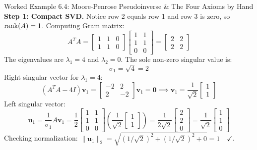 \begin{examplebox}[breakable]{Worked Example 6.4: Moore-Penrose Pseudoinverse \& The Four Axioms by Hand}
\textbf{Step 1: Compact SVD.}
Notice row 2 equals row 1 and row 3 is zero, so $\operatorname{rank}(A) = 1$.
Computing Gram matrix:
\begin{equation}
A^T A = \begin{bmatrix} 1 & 1 & 0 \\ 1 & 1 & 0 \end{bmatrix} \begin{bmatrix} 1 & 1 \\ 1 & 1 \\ 0 & 0 \end{bmatrix} = \begin{bmatrix} 2 & 2 \\ 2 & 2 \end{bmatrix}
\end{equation}
The eigenvalues are $\lambda_1 = 4$ and $\lambda_2 = 0$.
The sole non-zero singular value is:
\begin{equation}
\sigma_1 = \sqrt{4} = 2
\end{equation}
Right singular vector for $\lambda_1 = 4$:
\begin{equation}
(A^T A - 4I)\mathbf{v}_1 = \begin{bmatrix} -2 & 2 \\ 2 & -2 \end{bmatrix}\mathbf{v}_1 = \mathbf{0} \implies \mathbf{v}_1 = \frac{1}{\sqrt{2}}\begin{bmatrix} 1 \\ 1 \end{bmatrix}
\end{equation}
Left singular vector:
\begin{equation}
\mathbf{u}_1 = \frac{1}{\sigma_1} A \mathbf{v}_1 = \frac{1}{2} \begin{bmatrix} 1 & 1 \\ 1 & 1 \\ 0 & 0 \end{bmatrix} \left( \frac{1}{\sqrt{2}}\begin{bmatrix} 1 \\ 1 \end{bmatrix} \right) = \frac{1}{2\sqrt{2}} \begin{bmatrix} 2 \\ 2 \\ 0 \end{bmatrix} = \frac{1}{\sqrt{2}}\begin{bmatrix} 1 \\ 1 \\ 0 \end{bmatrix}
\end{equation}
Checking normalization: $\|\mathbf{u}_1\|_2 = \sqrt{(1/\sqrt{2})^2 + (1/\sqrt{2})^2 + 0} = 1 \quad \checkmark$.


\end{examplebox}

